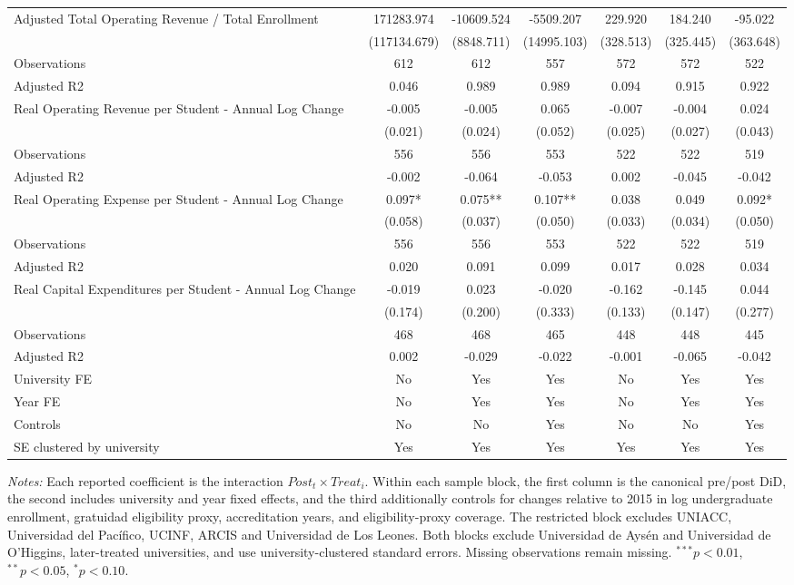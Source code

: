 \begin{table}[!htbp]
{\begin{tabular}{lcccccc}
Adjusted Total Operating Revenue / Total Enrollment & 171283.974 & -10609.524 & -5509.207 & 229.920 & 184.240 & -95.022 \\
 & (117134.679) & (8848.711) & (14995.103) & (328.513) & (325.445) & (363.648) \\
\quad Observations & 612 & 612 & 557 & 572 & 572 & 522 \\
\quad Adjusted R2 & 0.046 & 0.989 & 0.989 & 0.094 & 0.915 & 0.922 \\
Real Operating Revenue per Student - Annual Log Change & -0.005 & -0.005 & 0.065 & -0.007 & -0.004 & 0.024 \\
 & (0.021) & (0.024) & (0.052) & (0.025) & (0.027) & (0.043) \\
\quad Observations & 556 & 556 & 553 & 522 & 522 & 519 \\
\quad Adjusted R2 & -0.002 & -0.064 & -0.053 & 0.002 & -0.045 & -0.042 \\
Real Operating Expense per Student - Annual Log Change & 0.097* & 0.075** & 0.107** & 0.038 & 0.049 & 0.092* \\
 & (0.058) & (0.037) & (0.050) & (0.033) & (0.034) & (0.050) \\
\quad Observations & 556 & 556 & 553 & 522 & 522 & 519 \\
\quad Adjusted R2 & 0.020 & 0.091 & 0.099 & 0.017 & 0.028 & 0.034 \\
Real Capital Expenditures per Student - Annual Log Change & -0.019 & 0.023 & -0.020 & -0.162 & -0.145 & 0.044 \\
 & (0.174) & (0.200) & (0.333) & (0.133) & (0.147) & (0.277) \\
\quad Observations & 468 & 468 & 465 & 448 & 448 & 445 \\
\quad Adjusted R2 & 0.002 & -0.029 & -0.022 & -0.001 & -0.065 & -0.042 \\
\midrule
University FE & No & Yes & Yes & No & Yes & Yes \\
Year FE & No & Yes & Yes & No & Yes & Yes \\
Controls & No & No & Yes & No & No & Yes \\
SE clustered by university & Yes & Yes & Yes & Yes & Yes & Yes \\
\bottomrule
\end{tabular}%
}
\begin{minipage}{0.98\textwidth}
\footnotesize \textit{Notes:} Each reported coefficient is the interaction $Post_t \times Treat_i$. Within each sample block, the first column is the canonical pre/post DiD, the second includes university and year fixed effects, and the third additionally controls for changes relative to 2015 in log undergraduate enrollment, gratuidad eligibility proxy, accreditation years, and eligibility-proxy coverage. The restricted block excludes UNIACC, Universidad del Pacífico, UCINF, ARCIS and Universidad de Los Leones. Both blocks exclude Universidad de Aysén and Universidad de O'Higgins, later-treated universities, and use university-clustered standard errors. Missing observations remain missing. $^{***}p<0.01$, $^{**}p<0.05$, $^{*}p<0.10$.
\end{minipage}
\end{table}
